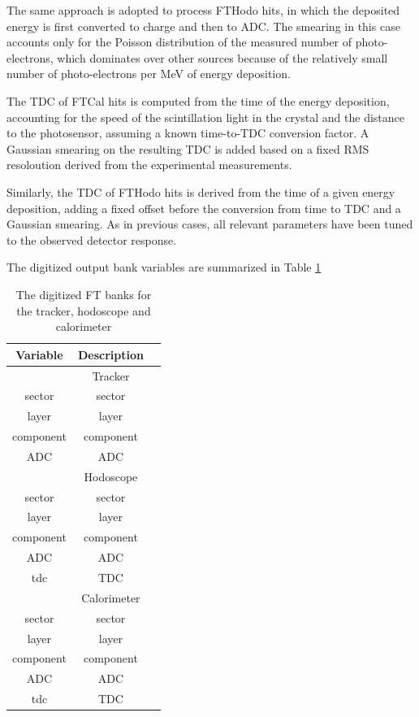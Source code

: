 The same approach is adopted to process FTHodo hits, in which the deposited energy is first converted to charge and then to ADC.
The smearing in this case accounts only for the Poisson distribution of the measured number of photo-electrons,
which dominates over other sources because of the relatively small number of photo-electrons per MeV of energy deposition.

The TDC of FTCal hits is computed from the time of the energy deposition, accounting for the speed of the scintillation light in
the crystal and the distance to the photosensor, assuming a known time-to-TDC conversion factor. A Gaussian smearing on the
resulting TDC is added based on a fixed RMS resoloution derived from the experimental measurements.

Similarly, the TDC of FTHodo hits is derived from the time of a given energy deposition, adding a fixed offset before the
conversion from time to TDC and a Gaussian smearing. As in previous cases, all relevant parameters have been tuned to the
observed detector response.

The digitized output bank variables are summarized in Table \ref{tab:ftBank}

\begin{table}[h]
	\begin{center}
		\begin{tabular}{| c | c | c |}
			\hline \hline
			Variable         & Description    \\
			\hline
		            & Tracker  &   \\
			\hline
                       sector  &     sector     \\
                        layer  &      layer     \\
                    component  &  component     \\
                          ADC  &        ADC     \\
			\hline
		          & Hodoscope  &   \\
			\hline
					   sector  &     sector     \\
                        layer  &      layer     \\
                    component  &  component     \\
                          ADC  &        ADC     \\
                          tdc  &        TDC     \\
			\hline
				  & Calorimeter  &   \\
			\hline
				         sector  &     sector      \\
				   	      layer  &      layer      \\
					  component  &  component      \\
							ADC  &        ADC      \\
							tdc  &        TDC      \\
			\hline \hline
		\end{tabular}
	\end{center}
	\caption{The digitized FT banks for the tracker, hodoscope and calorimeter}\label{tab:ftBank}
\end{table}

